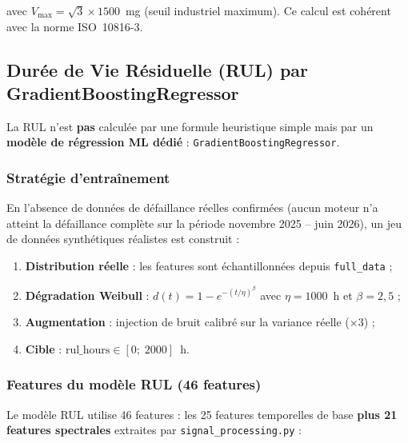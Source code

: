 \documentclass[12pt,a4paper]{report}
\begin{document}
avec $V_{\text{max}} = \sqrt{3} \times 1500$~mg (seuil industriel maximum).
Ce calcul est cohérent avec la norme ISO~10816-3.

\subsection{Durée de Vie Résiduelle (RUL) par GradientBoostingRegressor}

La RUL n'est \textbf{pas} calculée par une formule heuristique simple mais par un
\textbf{modèle de régression ML dédié} : \texttt{GradientBoostingRegressor}.

\subsubsection{Stratégie d'entraînement}

En l'absence de données de défaillance réelles confirmées (aucun moteur n'a atteint
la défaillance complète sur la période novembre 2025 -- juin 2026), un jeu de données
synthétiques réalistes est construit :

\begin{enumerate}
  \item \textbf{Distribution réelle} : les features sont échantillonnées depuis \texttt{full\_data} ;
  \item \textbf{Dégradation Weibull} : $d(t) = 1 - e^{-(t/\eta)^\beta}$ avec $\eta=1000$~h et $\beta=2{,}5$ ;
  \item \textbf{Augmentation} : injection de bruit calibré sur la variance réelle (×3) ;
  \item \textbf{Cible} : $\text{rul\_hours} \in [0;\; 2000]$~h.
\end{enumerate}

\subsubsection{Features du modèle RUL (46 features)}

Le modèle RUL utilise 46 features : les 25 features temporelles de base
\textbf{plus 21 features spectrales} extraites par \texttt{signal\_processing.py} :
\end{document}
